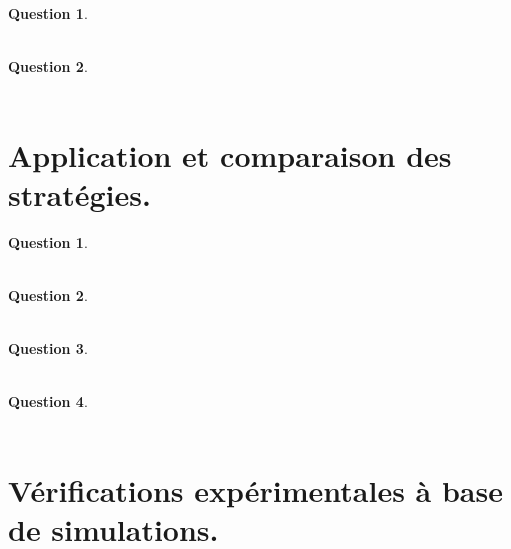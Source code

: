 \documentclass[a4paper,11pt]{article}
\newtheorem{exo2}{Question}
\newtheorem{exo3}{Question}
\begin{document}
\begin{exo2} \ \\ \\

\end{exo2}

\begin{exo2} \ \\ \\

\end{exo2}

\newpage

\section{Application et comparaison des stratégies.}

\begin{exo3} \ \\ \\

\end{exo3}

\begin{exo3} \ \\ \\

\end{exo3}

\begin{exo3} \ \\ \\

\end{exo3}

\begin{exo3} \ \\ \\

\end{exo3}

\newpage

\section{Vérifications expérimentales à base de simulations.}
\end{document}
